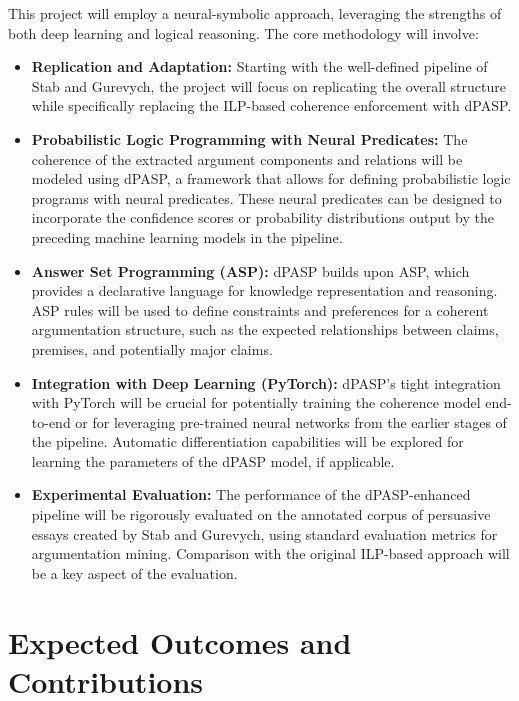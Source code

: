 \documentclass{article}
\begin{document}
This project will employ a neural-symbolic approach, leveraging the strengths of
both deep learning and logical reasoning. The core methodology will involve:

\begin{itemize}
    \item \textbf{Replication and Adaptation:} Starting with the well-defined
    pipeline of Stab and Gurevych, the project will focus on replicating the
    overall structure while specifically replacing the ILP-based coherence
    enforcement with dPASP.

    \item \textbf{Probabilistic Logic Programming with Neural Predicates:} The
    coherence of the extracted argument components and relations will be modeled
     using dPASP, a framework that allows for defining probabilistic logic
     programs with neural predicates. These neural predicates can be designed to
     incorporate the confidence scores or probability distributions output by
     the preceding machine learning models in the pipeline.

    \item \textbf{Answer Set Programming (ASP):} dPASP builds upon ASP, which
    provides a declarative language for knowledge representation and reasoning.
    ASP rules will be used to define constraints and preferences for a coherent
    argumentation structure, such as the expected relationships between claims,
    premises, and potentially major claims.

    \item \textbf{Integration with Deep Learning (PyTorch):} dPASP's tight
    integration with PyTorch will be crucial for potentially training the
    coherence model end-to-end or for leveraging pre-trained neural networks
    from the earlier stages of the pipeline. Automatic differentiation
    capabilities will be explored for learning the parameters of the dPASP
    model, if applicable.

    \item \textbf{Experimental Evaluation:} The performance of the
    dPASP-enhanced pipeline will be rigorously evaluated on the annotated corpus
    of persuasive essays created by Stab and Gurevych, using standard evaluation
    metrics for argumentation mining. Comparison with the original ILP-based
    approach will be a key aspect of the evaluation.
\end{itemize}

\section{Expected Outcomes and Contributions}
\end{document}
